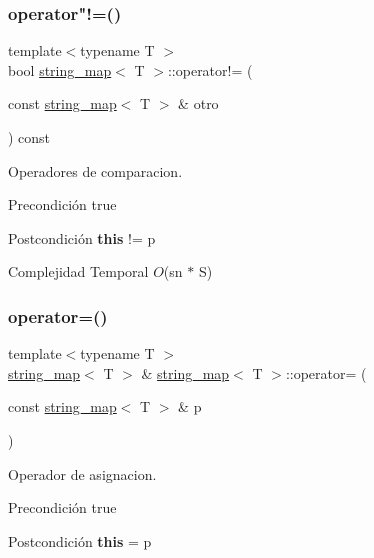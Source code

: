\subsubsection{\texorpdfstring{operator"!=()}{operator!=()}}
{\footnotesize\ttfamily template$<$typename T $>$ \\
bool \mbox{\hyperlink{classstring__map}{string\+\_\+map}}$<$ T $>$\+::operator!= (\begin{DoxyParamCaption}\item[{const \mbox{\hyperlink{classstring__map}{string\+\_\+map}}$<$ T $>$ \&}]{otro }\end{DoxyParamCaption}) const}



Operadores de comparacion. 

\begin{DoxyPrecond}{Precondición}
true 
\end{DoxyPrecond}
\begin{DoxyPostcond}{Postcondición}
{\bfseries this} != p 
\begin{DoxyDescription}
\item[Complejidad Temporal]$O$(sn $\ast$ S)
\end{DoxyDescription}
\end{DoxyPostcond}
\mbox{\label{classstring__map_a96848d5ec60072643cae6c412a8c2d8f}} 
\subsubsection{\texorpdfstring{operator=()}{operator=()}}
{\footnotesize\ttfamily template$<$typename T $>$ \\
\mbox{\hyperlink{classstring__map}{string\+\_\+map}}$<$ T $>$ \& \mbox{\hyperlink{classstring__map}{string\+\_\+map}}$<$ T $>$\+::operator= (\begin{DoxyParamCaption}\item[{const \mbox{\hyperlink{classstring__map}{string\+\_\+map}}$<$ T $>$ \&}]{p }\end{DoxyParamCaption})}



Operador de asignacion. 

\begin{DoxyPrecond}{Precondición}
true 
\end{DoxyPrecond}
\begin{DoxyPostcond}{Postcondición}
{\bfseries this} = p
\end{DoxyPostcond}

